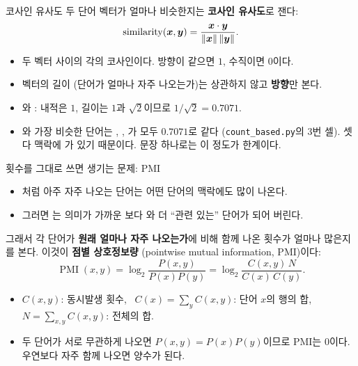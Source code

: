 \documentclass[aspectratio=169,11pt]{beamer}
\begin{document}
\begin{frame}{코사인 유사도}
두 단어 벡터가 얼마나 비슷한지는 \textbf{코사인 유사도}로 잰다:
\[
\operatorname{similarity}(\bm{x},\bm{y})=\frac{\bm{x}\cdot\bm{y}}{\|\bm{x}\|\,\|\bm{y}\|}.
\]
\begin{itemize}
\item 두 벡터 사이의 각의 코사인이다. 방향이 같으면 $1$, 수직이면 $0$이다.
\item 벡터의 길이 (단어가 얼마나 자주 나오는가)는 상관하지 않고 \textbf{방향}만 본다.
\end{itemize}
\vskip1mm
\begin{keybox}[예문에서]
\begin{itemize}
\item {}와 : 내적은 $1$, 길이는 $1$과 $\sqrt2$이므로 $1/\sqrt2=0.7071$.
\item {}와 가장 비슷한 단어는 , , 가 모두 $0.7071$로 같다 (\texttt{count\_based.py}의 3번 셀).
셋 다 맥락에 가 있기 때문이다. 문장 하나로는 이 정도가 한계이다.
\end{itemize}
\end{keybox}
\end{frame}

\begin{frame}{횟수를 그대로 쓰면 생기는 문제: PMI}
\begin{itemize}
\item {}처럼 아주 자주 나오는 단어는 어떤 단어의 맥락에도 많이 나온다.
\item 그러면 는 의미가 가까운 보다 와 더 ``관련 있는'' 단어가 되어 버린다.
\end{itemize}
그래서 각 단어가 \textbf{원래 얼마나 자주 나오는가}에 비해 함께 나온 횟수가 얼마나 많은지를 본다.
이것이 \textbf{점별 상호정보량} (pointwise mutual information, PMI)이다:
\[
\operatorname{PMI}(x,y)=\log_2\frac{P(x,y)}{P(x)P(y)}=\log_2\frac{C(x,y)\,N}{C(x)\,C(y)} .
\]
\begin{itemize}
\item $C(x,y)$: 동시발생 횟수, \ $C(x)=\sum_yC(x,y)$: 단어 $x$의 행의 합, \ $N=\sum_{x,y}C(x,y)$: 전체의 합.
\item 두 단어가 서로 무관하게 나오면 $P(x,y)=P(x)P(y)$이므로 PMI는 $0$이다.
우연보다 자주 함께 나오면 양수가 된다.
\end{itemize}
\end{frame}
\end{document}
